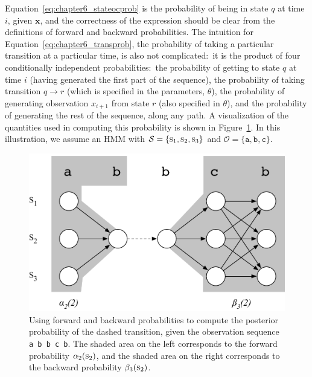\noindent Equation~\ref{eq:chapter6_stateocprob} is the probability of
being in state $q$ at time $i$, given $\textbf{x}$, and the
correctness of the expression should be clear from the definitions of
forward and backward probabilities.  The intuition for
Equation~\ref{eq:chapter6_transprob}, the probability of taking a
particular transition at a particular time, is also not
complicated:\ it is the product of four conditionally independent
probabilities:\ the probability of getting to state $q$ at time $i$
(having generated the first part of the sequence), the probability of
taking transition $q \rightarrow r$ (which is specified in the
parameters, $\theta$), the probability of generating observation
$x_{i+1}$ from state $r$ (also specified in $\theta$), and the
probability of generating the rest of the sequence, along any path.  A
visualization of the quantities used in computing this probability is
shown in Figure~\ref{chapter6_forwardbackward}.  In this illustration,
we assume an HMM with $\mathcal{S} = \{ \textsc{s}_1, \textsc{s}_2,
\textsc{s}_3 \}$ and $\mathcal{O}=\{\texttt{a}, \texttt{b}, \texttt{c}
\}$.

\begin{figure}[t]
\begin{center}
\vspace{0.2cm}
\includegraphics[scale=0.55]{figures/fig-ch6-HMM-forward-backward.pdf}
\vspace{-0.3cm}
\end{center}\caption{Using forward and backward probabilities to compute the posterior probability of the dashed transition, given the observation sequence {\texttt{ a b b c b}.  The shaded area on the left corresponds to the forward probability $\alpha_{2}(\textsc{s}_2)$, and the shaded area on the right corresponds to the backward probability $\beta_3(\textsc{s}_2)$.}\label{chapter6_forwardbackward}}
\end{figure}

